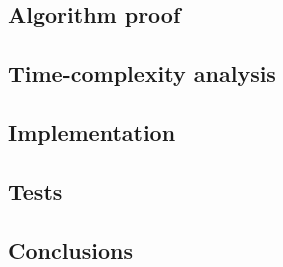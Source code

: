 \documentclass[a4paper,10pt,notitlepage]{article}
\begin{document}
\subsection{Algorithm proof}

\subsection{Time-complexity analysis}

\subsection{Implementation}

\subsection{Tests}

\subsection{Conclusions}
\end{document}

